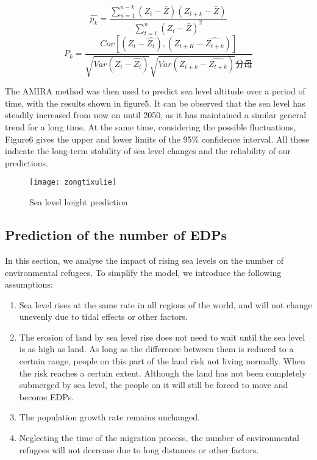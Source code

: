 \documentclass{mcmthesis}
\begin{document}
\begin{equation}
\hat{p_{k}}=\dfrac{\sum_{n=1}^{n-k}(Z_{t}-\bar{Z})(Z_{t+k}-\bar{Z})}{\sum_{t=1}^{n}(Z_{t}-\bar{Z})^2}
\end{equation}
\begin{equation}
P_{k}=\dfrac{Cov[(Z_{t}-\hat{Z_{t}}),(Z_{t+K}-\hat{Z_{t+k}})]}{\sqrt{Var(Z_{t}-\hat{Z_{t}})}\sqrt{Var(Z_{t+k}-\hat{Z_{t+k}})}分母}
\end{equation}

The AMIRA method was then used to predict sea level altitude over a period of time, with the results shown in figure5.  It can be observed that the sea level has steadily increased from now on until 2050, as it has maintained a similar general trend for a long time. At the same time, considering the possible fluctuations, Figure6 gives the upper and lower limits of the 95\% confidence interval. All these indicate the long-term stability of sea level changes and the reliability of our predictions. 
\begin{figure}[h]%
	\small
	\centering
	\texttt{[image: zongtixulie]}%
	\caption{Sea level height prediction} \label{fig:5}%
\end{figure}
\subsection{Prediction of the number of EDPs}
In this section, we analyse the impact of rising sea levels on the number of environmental refugees.
To simplify the model, we introduce the following assumptions:
\begin{enumerate}
\item Sea level rises at the same rate in all regions of the world, and will not change unevenly due to tidal effects or other factors.
\item The erosion of land by sea level rise does not need to wait until the sea level is as high as land. As long as the difference between them is reduced to a certain range, people on this part of the land risk not living normally. When the risk reaches a certain extent. Although the land has not been completely submerged by sea level, the people on it will still be forced to move and become EDPs.
\item The population growth rate remains unchanged.
\item Neglecting the time of the migration process, the number of environmental refugees will not decrease due to long distances or other factors.
\end{enumerate}
\end{document}
